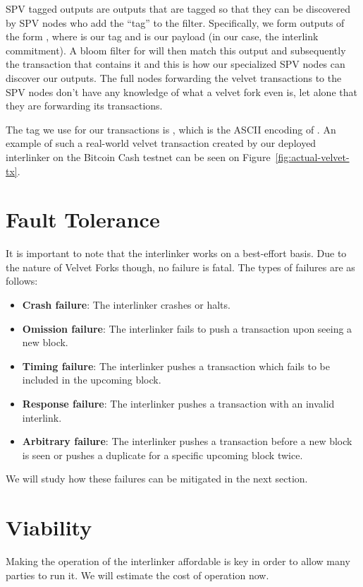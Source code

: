 SPV tagged outputs are outputs that are tagged so that they can be discovered by SPV nodes who add the ``tag'' to the filter. Specifically, we form outputs of the form , where  is our tag and  is our payload (in our case, the interlink commitment). A bloom filter for  will then match this output and subsequently the transaction that contains it and this is how our specialized SPV nodes can discover our outputs. The full nodes forwarding the velvet transactions to the SPV nodes don't have any knowledge of what a velvet fork even is, let alone that they are forwarding its transactions.

The tag we use for our transactions is , which is the ASCII encoding of . An example of such a real-world velvet transaction created by our deployed interlinker on the Bitcoin Cash testnet can be seen on Figure~\ref{fig:actual-velvet-tx}.


\section{Fault Tolerance}
It is important to note that the interlinker works on a best-effort basis. Due to the nature of Velvet Forks though, no failure is fatal. The types of failures are as follows:

\begin{itemize}
  \item \textbf{Crash failure}: The interlinker crashes or halts.
  \item \textbf{Omission failure}: The interlinker fails to push a transaction upon seeing a new block.
  \item \textbf{Timing failure}: The interlinker pushes a transaction which fails to be included in the upcoming block.
  \item \textbf{Response failure}: The interlinker pushes a transaction with an invalid interlink.
  \item \textbf{Arbitrary failure}: The interlinker pushes a transaction before a new block is seen or pushes a duplicate for a specific upcoming block twice.
\end{itemize}

We will study how these failures can be mitigated in the next section.

\section{Viability}
Making the operation of the interlinker affordable is key in order to allow many parties to run it. We will estimate the cost of operation now.


